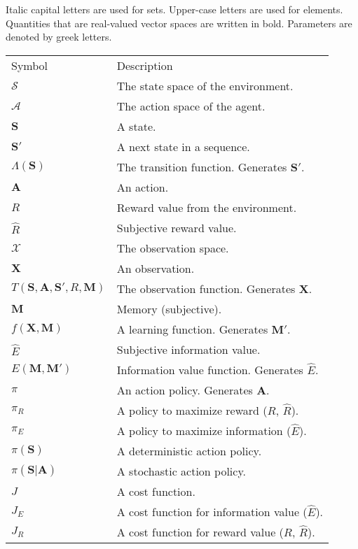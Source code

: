 Italic capital letters are used for sets. Upper-case letters are used for elements. Quantities that are real-valued vector spaces are written in bold. Parameters are denoted by greek letters.

\begin{table}[]
    \begin{tabular}{ll}
    Symbol & Description \\
    $\mathcal{S}$ & The state space of the environment. \\
    $\mathcal{A}$ & The action space of the agent. \\
    $\mathbf{S}$ & A state. \\
    $\mathbf{S'}$ & A next state in a sequence. \\
    $\Lambda(\mathbf{S})$ & The transition function. Generates $\mathbf{S'}$. \\
    $\mathbf{A}$ & An action. \\
    $R$ & Reward value from the environment. \\
    $\hat R$ & Subjective reward value. \\
    $\mathcal{X}$ & The observation space. \\
    $\mathbf{X}$ & An observation. \\
    $T(\mathbf{S},\mathbf{A},\mathbf{S'},R,\mathbf{M})$ & The observation function. Generates $\mathbf{X}$. \\
    $\mathbf{M}$ & Memory (subjective). \\
    $f(\mathbf{\mathbf{X},M})$ & A learning function. Generates $\mathbf{M'}$. \\
    $\hat E$ & Subjective information value. \\
    $E(\mathbf{M},\mathbf{M'})$ & Information value function. Generates $\hat E$. \\
    $\pi$ & An action policy. Generates $\mathbf{A}$. \\
    $\pi_R$ & A policy to maximize reward ($R$, $\hat R$). \\
    $\pi_E$ & A policy to maximize information ($\hat E$). \\
    $\pi(\mathbf{S})$ & A deterministic action policy. \\
    $\pi(\mathbf{S}|\mathbf{A})$ & A stochastic action policy. \\
    $J$ & A cost function. \\
    $J_E$ & A cost function for information value ($\hat E$). \\
    $J_R$ & A cost function for reward value ($R$, $\hat R$). \\

\end{tabular}
\end{table}
